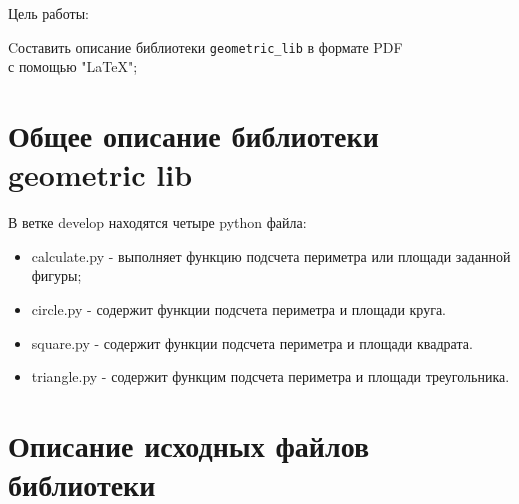\documentclass[a4paper,12pt]{report}
\begin{document}
	
	
	
	\newpage
	\tableofcontents
	
	
	\begin{framed}
		\noindent Цель работы:
		\begin{tabbing}
			Cоставить описание библиотеки \verb|geometric_lib| в формате PDF \\
			с помощью "\LaTeX";
		\end{tabbing}
		
	\end{framed}
	
	
	\newpage
	\section{Общее описание библиотеки geometric lib}
	
	В ветке develop находятся четыре python файла:
	\begin{itemize}
		\item calculate.py - выполняет функцию подсчета периметра или площади заданной фигуры;
		\item circle.py - содержит функции подсчета периметра и площади круга.
		\item square.py - содержит функции подсчета периметра и площади квадрата.
		\item triangle.py - содержит функцим подсчета периметра и площади треугольника.
	\end{itemize}
	
	
	
	\newpage
	\section{Описание исходных файлов библиотеки}
	
\end{document}
